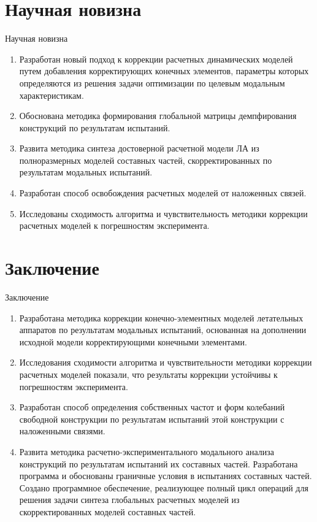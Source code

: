 
\section{Научная новизна}

\begin{frame}{Научная новизна}
	\begin{enumerate}
		\item Разработан новый подход к коррекции расчетных динамических моделей путем добавления корректирующих конечных элементов, параметры которых определяются из решения задачи оптимизации по целевым модальным характеристикам.
		\item Обоснована методика формирования глобальной матрицы демпфирования конструкций по результатам испытаний.
		\item Развита методика синтеза достоверной расчетной модели ЛА из полноразмерных моделей составных частей, скорректированных по результатам модальных испытаний.
		\item Разработан способ освобождения расчетных моделей от наложенных связей.
		\item Исследованы сходимость алгоритма и чувствительность методики коррекции расчетных моделей к погрешностям эксперимента. 
	\end{enumerate}
\end{frame}

\section{Заключение}

\begin{frame}{Заключение}
	\begin{enumerate}
		\item Разработана методика коррекции конечно-элементных моделей летательных аппаратов по результатам модальных испытаний, основанная на дополнении исходной модели корректирующими конечными элементами.
		\item Исследования сходимости алгоритма и чувствительности методики коррекции расчетных моделей показали, что результаты коррекции устойчивы к погрешностям эксперимента. 
		\item Разработан способ определения собственных частот и форм колебаний свободной конструкции по результатам испытаний этой конструкции с наложенными связями.
		\item Развита методика расчетно-экспериментального модального анализа конструкций по результатам испытаний их составных частей. Разработана программа и обоснованы граничные условия в испытаниях составных частей. Создано программное обеспечение, реализующее полный цикл операций для решения задачи синтеза глобальных расчетных моделей из скорректированных моделей составных частей.
	\end{enumerate}
\end{frame}

